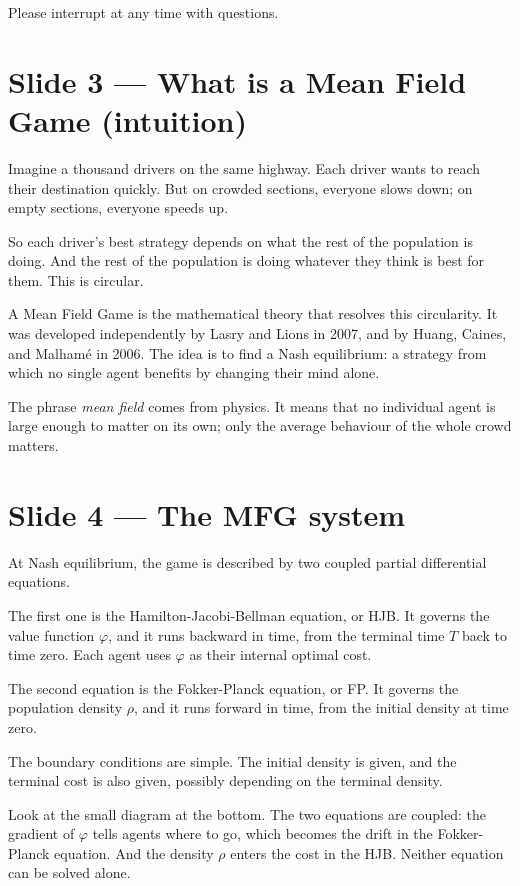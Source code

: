 \documentclass[11pt]{article}
\begin{document}
Please interrupt at any time with questions.

\section*{Slide 3 --- What is a Mean Field Game (intuition)}

Imagine a thousand drivers on the same highway.  Each driver wants to
reach their destination quickly.  But on crowded sections, everyone slows
down; on empty sections, everyone speeds up.

So each driver's best strategy depends on what the rest of the population
is doing.  And the rest of the population is doing whatever they think is
best for them.  This is circular.

A Mean Field Game is the mathematical theory that resolves this
circularity.  It was developed independently by Lasry and Lions in 2007,
and by Huang, Caines, and Malham\'e in 2006.  The idea is to find a Nash
equilibrium: a strategy from which no single agent benefits by changing
their mind alone.

The phrase \emph{mean field} comes from physics.  It means that no
individual agent is large enough to matter on its own; only the average
behaviour of the whole crowd matters.

\section*{Slide 4 --- The MFG system}

At Nash equilibrium, the game is described by two coupled partial
differential equations.

The first one is the Hamilton-Jacobi-Bellman equation, or HJB.  It governs
the value function $\varphi$, and it runs backward in time, from the
terminal time $T$ back to time zero.  Each agent uses $\varphi$ as their
internal optimal cost.

The second equation is the Fokker-Planck equation, or FP.  It governs the
population density $\rho$, and it runs forward in time, from the initial
density at time zero.

The boundary conditions are simple.  The initial density is given, and
the terminal cost is also given, possibly depending on the terminal
density.

Look at the small diagram at the bottom.  The two equations are coupled:
the gradient of $\varphi$ tells agents where to go, which becomes the
drift in the Fokker-Planck equation.  And the density $\rho$ enters the
cost in the HJB.  Neither equation can be solved alone.
\end{document}
